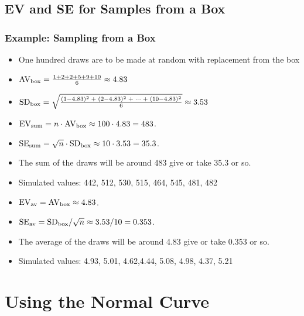 \documentclass[t]{beamer}
\begin{document}
\subsection{EV and SE for Samples from a Box}
\begin{frame}
\frametitle{Example:  Sampling from a Box}

\scriptsize
\begin{itemize}
\item One hundred draws are  to be made at random with replacement from the
box
\begin{center}
\end{center}
\item  $\mbox{AV}_{\scriptsize\mbox{box}}  = \frac{1+2+2+5+9+10}{6}\approx 4.83$
\item  $\mbox{SD}_{\scriptsize\mbox{box}}  = 
\sqrt{\frac{(1-4.83)^2\;+\;(2-4.83)^2\;+\;\cdots\; +\; (10-4.83)^2}{6}}\approx 3.53$
\item \color{blue}
    $\mbox{EV}_{\scriptsize\mbox{sum}}  = n\cdot \mbox{AV}_{\scriptsize\mbox{box}}\approx 100\cdot 4.83 = 483$.
\item  \color{blue}$\mbox{SE}_{\scriptsize\mbox{sum}}  = \sqrt{n}\cdot \mbox{SD}_{\scriptsize\mbox{box}}\approx 
     10\cdot 3.53 = 35.3$.
\item The sum of the draws will be around 483 give or take 35.3 or so.
\item Simulated values:  442, 512, 530, 515, 464, 545, 481, 482\vspace{5pt}
\item  \color{darkgreen}$\mbox{EV}_{\scriptsize\mbox{av}}  = \mbox{AV}_{\scriptsize\mbox{box}}\approx 4.83$.
\item  \color{darkgreen}$\mbox{SE}_{\scriptsize\mbox{av}}  = \mbox{SD}_{\scriptsize\mbox{box}}/\sqrt{n}\approx 
     3.53/10 = 0.353$.
\item The average of the draws will be around 4.83 give or take 0.353 or so.
\item Simulated values: 4.93, 5.01, 4.62,4.44, 5.08, 4.98, 4.37, 5.21\vspace{5pt}
\end{itemize}

\end{frame}

\section{Using the Normal Curve}
\end{document}
